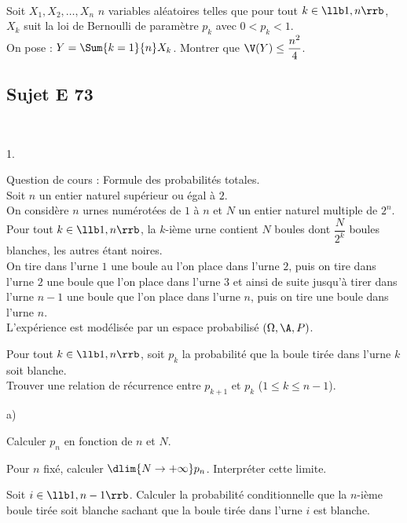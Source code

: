 \documentclass[11pt]{article}%
\begin{document}

\begin{exerciceSP}~\\
  Soit $X_1,X_2,\hdots,X_n$ $n$ variables aléatoires telles que pour
  tout $k\in\llb 1,n\rrb$, $X_k$ suit la loi de Bernoulli de paramètre
  $p_k$ avec $0 < p_k < 1$.\\
  On pose : $Y = \Sum{k=1}{n} X_k$. Montrer que $\V(Y)\leq
  \dfrac{n^2}{4}$.
\end{exerciceSP}



\subsection*{Sujet E 73}


\begin{exerciceAP}~
  \begin{noliste}{1.}
    \setlength{\itemsep}{2mm}
  \item Question de cours : Formule des probabilités totales.\\
    Soit $n$ un entier naturel supérieur ou égal à $2$.\\
    On considère $n$ urnes numérotées de $1$ à $n$ et $N$ un entier
    naturel multiple de $2^n$.\\
    Pour tout $k\in\llb 1,n\rrb$, la $k$-ième urne contient $N$ boules
    dont $\dfrac{N}{2^k}$ boules blanches, les autres étant noires.\\
    On tire dans l'urne $1$ une boule au l'on place dans l'urne $2$,
    puis on tire dans l'urne $2$ une boule que l'on place dans l'urne
    $3$ et ainsi de suite jusqu'à tirer dans l'urne $n-1$ une boule
    que l'on place dans l'urne $n$, puis on tire une boule dans l'urne
    $n$.\\
    L'expérience est modélisée par un espace probabilisé
    $(\Omega,\A,P)$.
  \item Pour tout $k\in\llb 1,n\rrb$, soit $p_k$ la probabilité que la
    boule tirée dans l'urne $k$ soit blanche.\\
    Trouver une relation de récurrence entre $p_{k+1}$ et $p_k$
    ($1\leq k\leq n-1$).
  \item 
    \begin{noliste}{a)}
    \setlength{\itemsep}{2mm}
    \item Calculer $p_n$ en fonction de $n$ et $N$.
    \item Pour $n$ fixé, calculer $\dlim{N\to+\infty}
      p_n$. Interpréter cette limite.
    \end{noliste}
  \item Soit $i\in\llb 1,n-1\rrb$. Calculer la probabilité
    conditionnelle que la $n$-ième boule tirée soit blanche sachant
    que la boule tirée dans l'urne $i$ est blanche.
  \end{noliste}
\end{exerciceAP}
\end{document}
